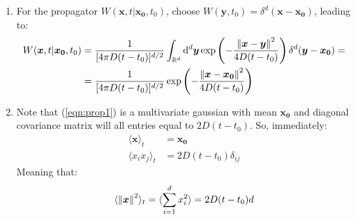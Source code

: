 \documentclass[../template.tex]{subfiles}
\begin{document}
\begin{exo}
    \begin{enumerate}
        \item For the propagator $W(\bm{x},t|\bm{x_0},t_0)$, choose $W(\bm{y},t_0) = \delta^d(\bm{x}-\bm{x_0})$, leading to:
        \begin{align} \nonumber
            W(\bm{x},t|\bm{x_0},t_0) &=     \frac{1}{[4 \pi D(t-t_0)]^{d/2}} \int_{\mathbb{R}^d} \dd[d]{\bm{y}} \exp\left(-\frac{\norm{\bm{x} - \bm{y}}^2}{4 D (t-t_0)} \right) \delta^d(\bm{y} -\bm{x_0}) =\\ \label{eqn:prop1}
            &= \frac{1}{[4 \pi D(t-t_0)]^{d/2}} \exp\left(-\frac{\norm{\bm{x} - \bm{x_0}}^2}{4 D (t-t_0)} \right)
        \end{align}
        \item Note that (\ref{eqn:prop1}) is a multivariate gaussian with mean $\bm{x_0}$ and diagonal covariance matrix will all entries equal to $2 D(t-t_0)$. So, immediately:
        \begin{align*}
            \langle \bm{x} \rangle_t &= \bm{x_0}\\
            \langle x_i x_j \rangle_t &= 2D (t-t_0) \delta_{ij}
        \end{align*}
        Meaning that:
        \begin{align*}
            \langle \norm{\bm{x}}^2 \rangle_t = \langle \sum_{i=1}^d x_i^2\rangle = 2D(t-t_0)d
        \end{align*}
            \end{enumerate}
    
\end{exo}
\end{document}
